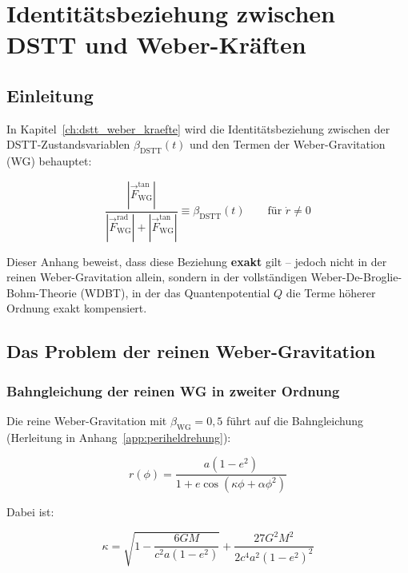 
\chapter{Identitätsbeziehung zwischen DSTT und Weber-Kräften}
\label{app:identitaetsbeziehung}

\section{Einleitung}
\label{app:identitaet_einleitung}

In Kapitel~\ref{ch:dstt_weber_kraefte} wird die Identitätsbeziehung 
zwischen der DSTT-Zustandsvariablen \(\beta_{\text{DSTT}}(t)\) und den Termen 
der Weber-Gravitation (WG) behauptet:

\[
\frac{|\vec{F}_{\text{WG}}^{\text{tan}}|}{|\vec{F}_{\text{WG}}^{\text{rad}}| + |\vec{F}_{\text{WG}}^{\text{tan}}|} \equiv \beta_{\text{DSTT}}(t) \qquad \text{für } \dot{r} \neq 0
\tag{G.1}
\]

Dieser Anhang beweist, dass diese Beziehung \textbf{exakt} gilt – jedoch nicht in der 
reinen Weber-Gravitation allein, sondern in der vollständigen 
Weber-De-Broglie-Bohm-Theorie (WDBT), in der das Quantenpotential \(Q\) 
die Terme höherer Ordnung exakt kompensiert.

\section{Das Problem der reinen Weber-Gravitation}
\label{app:identitaet_problem_wg}

\subsection{Bahngleichung der reinen WG in zweiter Ordnung}
\label{sub:identitaet_bahngleichung}

Die reine Weber-Gravitation mit \(\beta_{\text{WG}} = 0,5\) führt auf die 
Bahngleichung (Herleitung in Anhang~\ref{app:periheldrehung}):

\[
r(\phi) = \frac{a(1 - e^2)}{1 + e \cos(\kappa\phi + \alpha\phi^2)}
\tag{G.2}
\]

Dabei ist:

\[
\kappa = \sqrt{1 - \frac{6GM}{c^2 a(1-e^2)}} + \frac{27G^2M^2}{2c^4 a^2(1-e^2)^2}
\tag{G.3}
\]

